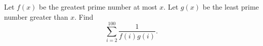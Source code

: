 Let $f\left(x\right)$ be the greatest prime number at most $x$. Let $g\left(x\right)$ be the least prime number greater than $x$. Find $$\sum_{i=2}^{100}\frac{1}{f\left(i\right)g\left(i\right)}.$$